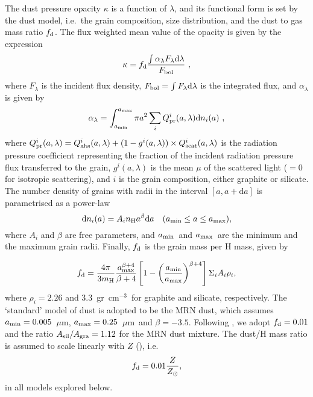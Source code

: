 \documentclass[a4paper,fleqn,usenatbib]{mnras}
\newcommand{\cmt}{cm$^{-3}$}
\newcommand{\dd}{\textrm{d}}
\newcommand{\amin}{\mbox{$a_{\rm min}$}}
\newcommand{\amax}{\mbox{$a_{\rm max}$}}
\newcommand{\mic}{\mbox{$\mu$m}}
\begin{document}
The dust pressure opacity $\kappa$ is a function of $\lambda$, and its functional form is set by the dust model, i.e.\ the grain composition, size distribution, and the
dust to gas mass ratio $f_{\rm d}$. The flux weighted mean value of the opacity is given by the expression
\begin{equation}
\kappa=f_{\rm d} \frac{\int \alpha_\lambda F_\lambda \dd\lambda }{F_{\rm bol}} \ ,
\end{equation}
where $F_\lambda$ is the incident flux density, $F_{\rm bol}=\int F_\lambda \dd\lambda$ is the integrated flux, and $\alpha_\lambda$ is given by
\begin{equation}
\alpha_{\lambda}= \int_{a_{\rm min}}^{a_{\rm max}} \pi a^2 \sum_i Q_{\rm pr}^i(a,\lambda)\dd n_i(a)\ , \label{eq:alpha_lambda}
\end{equation}
where $Q_{\rm pr}^i(a,\lambda)=Q_{\rm abs}^i(a,\lambda)+(1-g^i(a,\lambda))\times Q_{\rm scat}^i(a,\lambda)$ 
is the radiation pressure coefficient representing the fraction of the incident radiation pressure flux
transferred to the grain, $g^i(a,\lambda)$ is the mean $\mu$ of the scattered light ($=0$
for isotropic scattering), and $i$ is the grain composition, either graphite or silicate.
The number density of grains with radii in the interval $[a,a+\dd a]$ is parametrised as a power-law 
\begin{equation}
\dd n_i(a) = A_i n_{\rm H} a^{\beta} \dd a \quad (\amin\leq a\leq \amax), \label{eq:gr_size_distr}
\end{equation}
where $A_i$ and $\beta$ are free parameters, and \amin\ and \amax\ are the minimum and the maximum grain radii. 
Finally, $f_{\rm d}$ is the grain mass per H mass, given by

\begin{equation}
f_{\rm d} = \frac{4\pi}{3 m_{\rm H}}\frac{a_{\rm max}^{\beta+4}}{\beta+4} \left[1-\left(\frac{a_{\rm min}}{a_{\rm max}}\right)^{\beta+4}\right] \Sigma_i A_i \rho_i,
\end{equation}
where $\rho_i=2.26$ and 3.3~gr~\cmt\ for graphite and silicate, respectively. The `standard' model of dust is adopted to be the MRN dust, which assumes $\amin=0.005$~\mic, $\amax=0.25$~\mic\ and $\beta=-3.5$. Following \citet{draine_lee84}, we adopt $f_{\rm d}=0.01$ and the ratio $A_{\rm sil}/A_{\rm gra}=1.12$ for the MRN dust mixture. The dust/H mass ratio is assumed to scale linearly with $Z$ (\citealt*{Issa90, Draine07, Remy14}), i.e.
\begin{equation}
f_{\rm d}=0.01 \frac{Z}{Z_{\odot}}, \label{eq:fd_vs_Z}
\end{equation}
in all models explored below.
	
\end{document}

